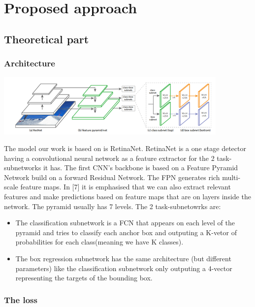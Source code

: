 \chapter{Proposed approach}
\label{CapFT}

\section{Theoretical part}

\subsection{Architecture}

\includegraphics{Fig/arch1.png}

The model our work is based on is RetinaNet.
RetinaNet is a one stage detector having a convolutional neural network as a feature extractor for the 2 task-subnetworks it has. 
The first CNN's backbone is based on a Feature Pyramid Network build on a forward Residual Network. The FPN generates rich multi-scale feature 
maps. In [7] it is emphasised that we can also extract relevant features and make predictions based on feature maps that are on layers 
inside the network.
The pyramid usually has 7 levels.
The 2 task-subnetowrks are:
\begin{itemize}
  \item The classification subnetwork is a FCN that appears on each level of the pyramid and tries to classify each anchor box and outputing a K-vetor of probabilities for each class(meaning we have K classes).
  \item The box regression subnetwork has the same architecture (but different parameters) like the classification subnetwork only outputing a 4-vector representing the targets of the bounding box.
\end{itemize}

\subsection{The loss}

